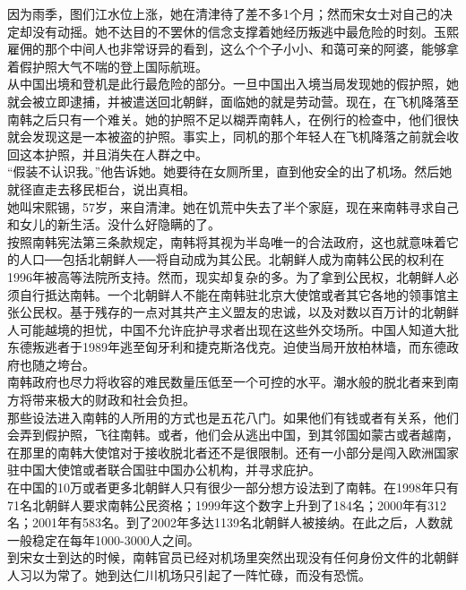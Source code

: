 因为雨季，图们江水位上涨，她在清津待了差不多1个月；然而宋女士对自己的决定却没有动摇。她不达目的不罢休的信念支撑着她经历叛逃中最危险的时刻。玉熙雇佣的那个中间人也非常讶异的看到，这么个个子小小、和蔼可亲的阿婆，能够拿着假护照大气不喘的登上国际航班。\\

从中国出境和登机是此行最危险的部分。一旦中国出入境当局发现她的假护照，她就会被立即逮捕，并被遣送回北朝鲜，面临她的就是劳动营。现在，在飞机降落至南韩之后只有一个难关。她的护照不足以糊弄南韩人，在例行的检查中，他们很快就会发现这是一本被盗的护照。事实上，同机的那个年轻人在飞机降落之前就会收回这本护照，并且消失在人群之中。\\

“假装不认识我。”他告诉她。她要待在女厕所里，直到他安全的出了机场。然后她就径直走去移民柜台，说出真相。\\

她叫宋熙锡，57岁，来自清津。她在饥荒中失去了半个家庭，现在来南韩寻求自己和女儿的新生活。没什么好隐瞒的了。\\

按照南韩宪法第三条款规定，南韩将其视为半岛唯一的合法政府，这也就意味着它的人口──包括北朝鲜人──将自动成为其公民。北朝鲜人成为南韩公民的权利在1996年被高等法院所支持。然而，现实却复杂的多。为了拿到公民权，北朝鲜人必须自行抵达南韩。一个北朝鲜人不能在南韩驻北京大使馆或者其它各地的领事馆主张公民权。基于残存的一点对其共产主义盟友的忠诚，以及对数以百万计的北朝鲜人可能越境的担忧，中国不允许庇护寻求者出现在这些外交场所。中国人知道大批东德叛逃者于1989年逃至匈牙利和捷克斯洛伐克。迫使当局开放柏林墙，而东德政府也随之垮台。\\

南韩政府也尽力将收容的难民数量压低至一个可控的水平。潮水般的脱北者来到南方将带来极大的财政和社会负担。\\

那些设法进入南韩的人所用的方式也是五花八门。如果他们有钱或者有关系，他们会弄到假护照，飞往南韩。或者，他们会从逃出中国，到其邻国如蒙古或者越南，在那里的南韩大使馆对于接收脱北者还不是很限制。还有一小部分是闯入欧洲国家驻中国大使馆或者联合国驻中国办公机构，并寻求庇护。\\

在中国的10万或者更多北朝鲜人只有很少一部分想方设法到了南韩。在1998年只有71名北朝鲜人要求南韩公民资格；1999年这个数字上升到了184名；2000年有312名；2001年有583名。到了2002年多达1139名北朝鲜人被接纳。在此之后，人数就一般稳定在每年1000-3000人之间。\\

到宋女士到达的时候，南韩官员已经对机场里突然出现没有任何身份文件的北朝鲜人习以为常了。她到达仁川机场只引起了一阵忙碌，而没有恐慌。\\

